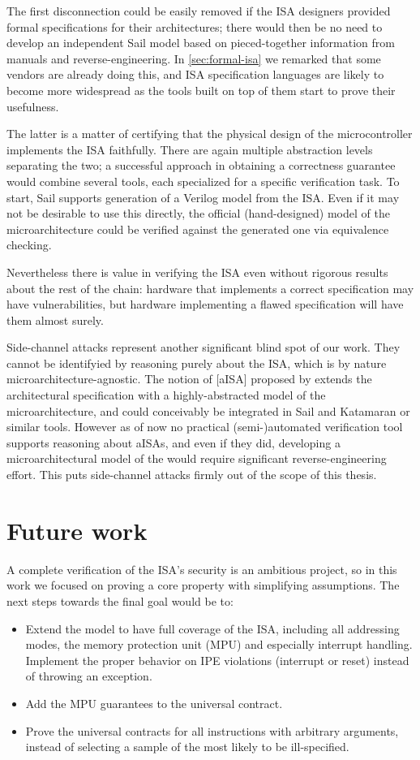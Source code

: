 The first disconnection could be easily removed if the ISA designers provided formal specifications for their architectures; there would then be no need to develop an independent Sail model based on pieced-together information from manuals and reverse-engineering. In \cref{sec:formal-isa} we remarked that some vendors are already doing this, and ISA specification languages are likely to become more widespread as the tools built on top of them start to prove their usefulness.

The latter is a matter of certifying that the physical design of the microcontroller implements the ISA faithfully. There are again multiple abstraction levels separating the two; a successful approach in obtaining a correctness guarantee would combine several tools, each specialized for a specific verification task. To start, Sail supports generation of a Verilog model from the ISA. Even if it may not be desirable to use this directly, the official (hand-designed) model of the microarchitecture could be verified against the generated one via equivalence checking.

Nevertheless there is value in verifying the ISA even without rigorous results about the rest of the chain: hardware that implements a correct specification may have vulnerabilities, but hardware implementing a flawed specification will have them almost surely.

Side-channel attacks represent another significant blind spot of our work. They cannot be identifyied by reasoning purely about the ISA, which is by nature microarchitecture-agnostic. The notion of [aISA] proposed by \cite{Ge2018} extends the architectural specification with a highly-abstracted model of the microarchitecture, and could conceivably be integrated in Sail and Katamaran or similar tools. However as of now no practical (semi-)automated verification tool supports reasoning about aISAs, and even if they did, developing a microarchitectural model of the \msp would require significant reverse-engineering effort. This puts side-channel attacks firmly out of the scope of this thesis.

\section{Future work}

A complete verification of the \msp ISA's security is an ambitious project, so in this work we focused on proving a core property with simplifying assumptions. The next steps towards the final goal would be to:
\begin{itemize}
\item Extend the model to have full coverage of the \msp ISA, including all addressing modes, the memory protection unit (MPU) and especially interrupt handling. Implement the proper behavior on IPE violations (interrupt or reset) instead of throwing an exception.
\item Add the MPU guarantees to the universal contract.
\item Prove the universal contracts for all instructions with arbitrary arguments, instead of selecting a sample of the most likely to be ill-specified.
\end{itemize}

